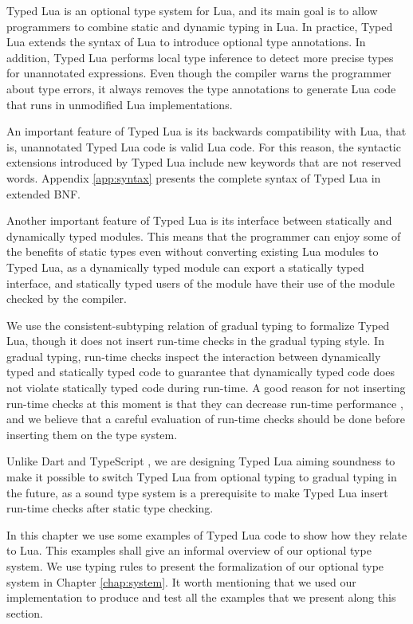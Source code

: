 Typed Lua is an optional type system for Lua, and its main goal is to
allow programmers to combine static and dynamic typing in Lua.
In practice, Typed Lua extends the syntax of Lua to introduce
optional type annotations.
In addition, Typed Lua performs local type inference \citep{pierce2000lti}
to detect more precise types for unannotated expressions.
Even though the compiler warns the programmer about type errors,
it always removes the type annotations to generate Lua code that
runs in unmodified Lua implementations.

An important feature of Typed Lua is its backwards compatibility with Lua,
that is, unannotated Typed Lua code is valid Lua code.
For this reason, the syntactic extensions introduced by Typed Lua
include new keywords that are not reserved words.
Appendix \ref{app:syntax} presents the complete syntax of Typed Lua
in extended BNF.

Another important feature of Typed Lua is its interface between
statically and dynamically typed modules.
This means that the programmer can enjoy some of the benefits of
static types even without converting existing Lua modules to Typed Lua,
as a dynamically typed module can export a statically typed interface,
and statically typed users of the module have their use of the module
checked by the compiler.

We use the consistent-subtyping relation of gradual typing
\citep{siek2007objects,siek2013mutable} to formalize Typed Lua,
though it does not insert run-time checks in the gradual typing style.
In gradual typing, run-time checks inspect the interaction between
dynamically typed and statically typed code to guarantee that dynamically
typed code does not violate statically typed code during run-time.
A good reason for not inserting run-time checks at this moment is that they
can decrease run-time performance \citep{allende2013cis}, and we believe that
a careful evaluation of run-time checks should be done before inserting them
on the type system.

Unlike Dart \citep{dart} and TypeScript \citep{typescript},
we are designing Typed Lua aiming soundness to make it possible to switch
Typed Lua from optional typing to gradual typing in the future,
as a sound type system is a prerequisite to make Typed Lua insert
run-time checks after static type checking.

In this chapter we use some examples of Typed Lua code to show how
they relate to Lua.
This examples shall give an informal overview of our optional type system.
We use typing rules to present the formalization of our optional type system
in Chapter \ref{chap:system}.
It worth mentioning that we used our implementation to produce and
test all the examples that we present along this section.

